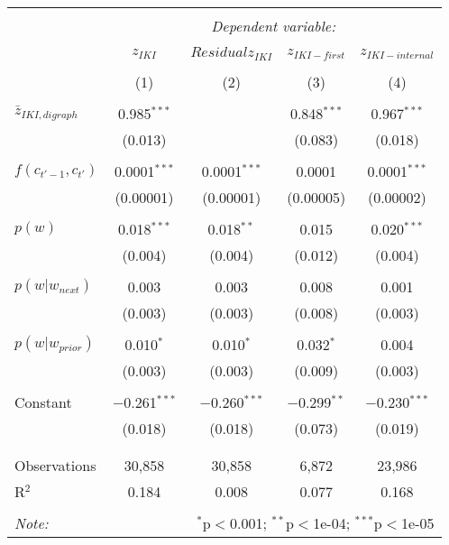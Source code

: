 
\begin{table*}[!htbp] \centering 
  \caption{} 
  \label{} 
\begin{tabular}{@{\extracolsep{5pt}}lcccc} 
\\[-1.8ex]\hline 
\hline \\[-1.8ex] 
 & \multicolumn{4}{c}{\textit{Dependent variable:}} \\ 
\cline{2-5} 
\\[-1.8ex] & $z_{IKI}$ & $Residual z_{IKI}$ & $z_{IKI-first}$ & $z_{IKI-internal}$ \\ 
\\[-1.8ex] & (1) & (2) & (3) & (4)\\ 
\hline \\[-1.8ex] 
 $\bar{z}_{IKI,digraph}$ & 0.985$^{***}$ &  & 0.848$^{***}$ & 0.967$^{***}$ \\ 
  & (0.013) &  & (0.083) & (0.018) \\ 
  & & & & \\ 
 $f(c_{t'-1},c_{t'})$ & 0.0001$^{***}$ & 0.0001$^{***}$ & 0.0001 & 0.0001$^{***}$ \\ 
  & (0.00001) & (0.00001) & (0.00005) & (0.00002) \\ 
  & & & & \\ 
 $p(w)$ & 0.018$^{***}$ & 0.018$^{**}$ & 0.015 & 0.020$^{***}$ \\ 
  & (0.004) & (0.004) & (0.012) & (0.004) \\ 
  & & & & \\ 
 $p(w|w_{next})$ & 0.003 & 0.003 & 0.008 & 0.001 \\ 
  & (0.003) & (0.003) & (0.008) & (0.003) \\ 
  & & & & \\ 
 $p(w|w_{prior})$ & 0.010$^{*}$ & 0.010$^{*}$ & 0.032$^{*}$ & 0.004 \\ 
  & (0.003) & (0.003) & (0.009) & (0.003) \\ 
  & & & & \\ 
 Constant & $-$0.261$^{***}$ & $-$0.260$^{***}$ & $-$0.299$^{**}$ & $-$0.230$^{***}$ \\ 
  & (0.018) & (0.018) & (0.073) & (0.019) \\ 
  & & & & \\ 
\hline \\[-1.8ex] 
Observations & 30,858 & 30,858 & 6,872 & 23,986 \\ 
R$^{2}$ & 0.184 & 0.008 & 0.077 & 0.168 \\ 
\hline 
\hline \\[-1.8ex] 
\textit{Note:}  & \multicolumn{4}{r}{$^{*}$p$<$0.001; $^{**}$p$<$1e-04; $^{***}$p$<$1e-05} \\ 
\end{tabular} 
\end{table*} 
